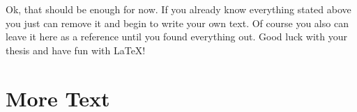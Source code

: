 Ok, that should be enough for now.
If you already know everything stated above you just can remove it and begin to write your own text.
Of course you also can leave it here as a reference until you found everything out.
Good luck with your thesis and have fun with \LaTeX{}!

\section{More Text}
\Blindtext

